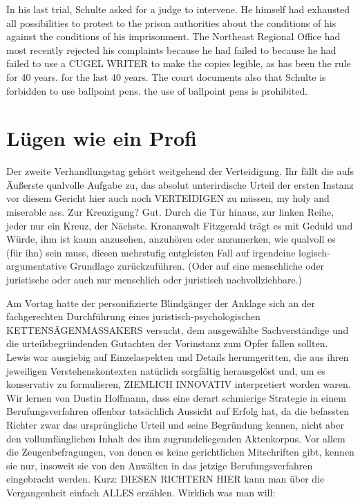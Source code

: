 \begin{multicols}{2}
In his last trial, Schulte asked for a judge to intervene. He himself had exhausted all possibilities
to protest to the prison authorities about the conditions of his
against the conditions of his imprisonment. The Northeast Regional Office had most recently rejected his complaints because he had failed to
because he had failed to use a CUGEL WRITER to make the copies legible, as has been the rule for 40 years.
for the last 40 years. The court documents also
that Schulte is forbidden to use ballpoint pens.
the use of ballpoint pens is prohibited.


\chapter{Lügen wie ein Profi} %

Der zweite Verhandlungstag gehört weitgehend der Verteidigung. Ihr fällt die aufs Äußerste qualvolle Aufgabe
zu, das absolut unterirdische Urteil der ersten Instanz
vor diesem Gericht hier auch noch VERTEIDIGEN zu
müssen, my holy and miserable ass. Zur Kreuzigung?
Gut. Durch die Tür hinaus, zur linken Reihe, jeder nur
ein Kreuz, der Nächste. Kronanwalt Fitzgerald trägt es
mit Geduld und Würde, ihm ist kaum anzusehen, anzuhören oder anzumerken, wie qualvoll es (für ihn) sein
muss, diesen mehrstufig entgleisten Fall auf irgendeine logisch-argumentative Grundlage zurückzuführen.
(Oder auf eine menschliche oder juristische oder auch nur menschlich oder juristisch nachvollziehbare.)

Am Vortag hatte der personifizierte Blindgänger der Anklage sich an der fachgerechten Durchführung eines juristisch-psychologischen KETTENSÄGENMASSAKERS
versucht, dem ausgewählte Sachverständige und die
urteilsbegründenden Gutachten der Vorinstanz zum
Opfer fallen sollten. Lewis war ausgiebig auf Einzelaspekten und Details herumgeritten, die aus ihren jeweiligen Verstehenskontexten natürlich sorgfältig herausgelöst und, um es konservativ zu formulieren, ZIEMLICH
INNOVATIV interpretiert worden waren. Wir lernen von
Dustin Hoffmann, dass eine derart schmierige Strategie
in einem Berufungsverfahren offenbar tatsächlich Aussicht auf Erfolg hat, da die befassten Richter zwar das ursprüngliche Urteil und seine Begründung kennen, nicht
aber den vollumfänglichen Inhalt des ihm zugrundeliegenden Aktenkorpus. Vor allem die Zeugenbefragungen,
von denen es keine gerichtlichen Mitschriften gibt, kennen sie nur, insoweit sie von den Anwälten in das jetzige
Berufungsverfahren eingebracht werden.
Kurz: DIESEN RICHTERN HIER kann man über die Vergangenheit einfach ALLES erzählen. Wirklich was man
will:


\end{multicols}
